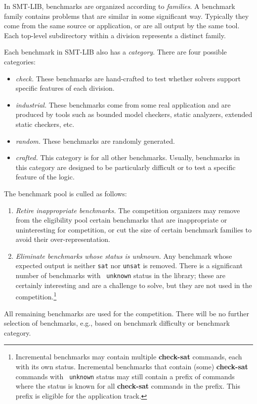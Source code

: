 \documentclass[12pt]{article}
\newcommand{\akey}[1]{\textbf{#1}}
\begin{document}
%
In SMT-LIB, benchmarks are organized according to \emph{families}.  A
benchmark family contains problems that are similar in some
significant way.  Typically they come from the same source or
application, or are all output by the same tool.  Each top-level
subdirectory within a division represents a distinct family.

Each benchmark in SMT-LIB also has a \emph{category}.  There are four
possible categories:
\begin{itemize}
\item \emph{check.} These benchmarks are hand-crafted to test whether
  solvers support specific features of each division.
\item \emph{industrial.} These benchmarks come from some real
  application and are produced by tools such as bounded model
  checkers, static analyzers, extended static checkers, etc.
\item \emph{random.} These benchmarks are randomly generated.
\item \emph{crafted.} This category is for all other benchmarks.
  Usually, benchmarks in this category are designed to be particularly
  difficult or to test a specific feature of the logic.
\end{itemize}

%
The benchmark pool is culled as follows:
\begin{enumerate}
\item \emph{Retire inappropriate benchmarks.} The competition
  organizers may remove from the eligibility pool certain benchmarks
  that are inappropriate or uninteresting for competition, or cut the
  size of certain benchmark families to avoid their
  over-representation.
\item \emph{Eliminate benchmarks whose status is unknown.} Any
  benchmark whose expected output is neither {\tt sat} nor {\tt unsat}
  is removed.  There is a significant number of benchmarks with {\tt
    unknown} status in the library; these are certainly interesting
  and are a challenge to solve, but they are not used in the
  competition.\footnote{Incremental benchmarks may contain multiple
    \akey{check-sat} commands, each with its own status.  Incremental
    benchmarks that contain (some) \akey{check-sat} commands with {\tt
      unknown} status may still contain a prefix of commands where the
    status is known for all \akey{check-sat} commands in the prefix.
    This prefix is eligible for the application track.}
\end{enumerate}
%
All remaining benchmarks are used for the competition.  There will be
no further selection of benchmarks, e.g., based on benchmark
difficulty or benchmark category.
\end{document}
